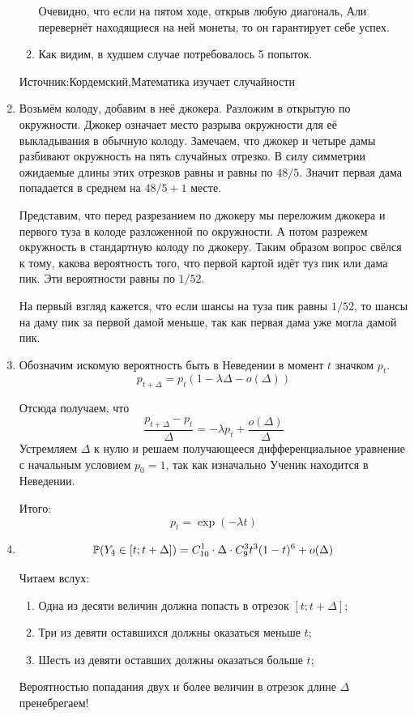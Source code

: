 \begin{enumerate}
\begin{enumerate}
Очевидно, что если на пятом ходе, открыв любую диагональ, Али перевернёт находящиеся на ней монеты, то он гарантирует себе успех.

\item Как видим, в худшем случае потребовалось 5 попыток.
\end{enumerate}
Источник:Кордемский,Математика изучает случайности

\item Возьмём колоду, добавим в неё джокера. Разложим в открытую по окружности.
Джокер означает место разрыва окружности для её выкладывания в обычную колоду.
Замечаем, что джокер и четыре дамы разбивают окружность на пять случайных отрезко.
В силу симметрии ожидаемые длины этих отрезков равны и равны по $48/5$.
Значит первая дама попадается в среднем на $48/5 + 1$ месте.

Представим, что перед разрезанием по джокеру мы переложим джокера и первого туза
в колоде разложенной по окружности. А потом разрежем окружность в стандартную
колоду по джокеру. Таким образом вопрос свёлся к тому, какова вероятность того,
что первой картой идёт туз пик или дама пик. Эти вероятности равны по $1/52$.

На первый взгляд кажется, что если шансы на туза пик равны $1/52$, то шансы на
даму пик за первой дамой меньше, так как первая дама уже могла дамой пик.

\item Обозначим искомую вероятность быть в Неведении в момент $t$ значком $p_t$.
\[
p_{t+\Delta} = p_t (1-\lambda\Delta - o(\Delta))
\]

Отсюда получаем, что
\[
\frac{p_{t+\Delta} - p_t}{\Delta} = -\lambda p_t + \frac{o(\Delta)}{\Delta}
\]
Устремляем $\Delta$ к нулю и решаем получающееся дифференциальное уравнение
с начальным условием $p_0 = 1$, так как изначально Ученик находится в Неведении.

Итого:
\[
p_t = \exp(-\lambda t)
\]

\item
\[
    \P(Y_4 \in [t; t+\Delta]) = C_{10}^1 \cdot \Delta \cdot C_{9}^3 t^3 (1-t)^6 + o(\Delta)
  \]

  Читаем вслух:
  \begin{enumerate}
    \item Одна из десяти величин должна попасть в отрезок $[t; t + \Delta]$;
    \item Три из девяти оставшихся должны оказаться меньше $t$;
    \item Шесть из девяти оставших должны оказаться больше $t$;
  \end{enumerate}
  Вероятностью попадания двух и более величин в отрезок длине $\Delta$ пренебрегаем!
\end{enumerate}

